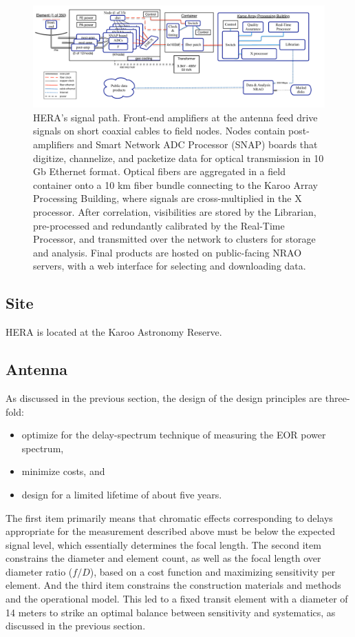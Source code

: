 \documentclass[preprint,11pt]{aastex}
\begin{document}
\begin{figure}[h]
	\centering
	\includegraphics[width=1\textwidth]{plots/HERA_high_level_block_diagram.pdf}
	\caption{HERA's signal path.  Front-end amplifiers at the antenna feed drive signals on short coaxial cables to 
field nodes.  Nodes contain post-amplifiers and Smart Network ADC Processor (SNAP) boards that digitize, channelize,
and packetize data for optical transmission in 10 Gb Ethernet format.  Optical fibers are aggregated in a field container
onto a 10 km fiber bundle connecting to the Karoo Array Processing Building, where signals are cross-multiplied
in the X processor.  After correlation, visibilities are stored by the Librarian, pre-processed and redundantly calibrated
by the Real-Time Processor, and transmitted over the network to clusters for storage and analysis.  Final products are
hosted on public-facing NRAO servers, with a web interface for selecting and downloading data.}
	\label{fig:overallBlockDiagram}
	\vspace{-5pt}
\end{figure}

\subsection{Site}
\label{sec:site}
HERA is located at the Karoo Astronomy Reserve.

\subsection{Antenna}
\label{sec:antenna}

As discussed in the previous section, the design of the design principles are three-fold:
\begin{itemize}
\item optimize for the delay-spectrum technique of measuring the EOR power spectrum,
\item minimize costs, and
\item design for a limited lifetime of about five years.
\end{itemize}
The first item primarily means that chromatic effects corresponding to delays appropriate for the measurement described above must be below the expected signal level, which essentially determines the focal length.  The second item constrains the diameter and element count, as well as the focal length over diameter ratio ($f/D$), based on a cost function and maximizing sensitivity per element.  And the third item constrains the construction materials and methods and the operational model.  This led to a fixed transit element with a diameter of 14 meters to strike an optimal balance between sensitivity and systematics, as discussed in the previous section.
\end{document}
